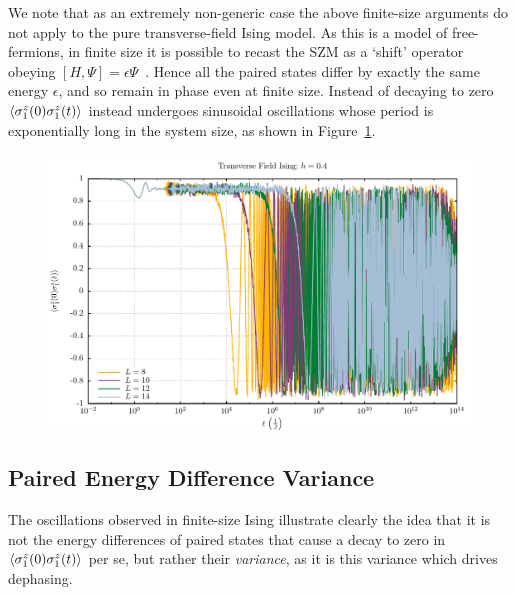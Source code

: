 \documentclass [a4paper, 11pt]{article}
\begin{document}
We note that as an extremely non-generic case the above finite-size arguments do not apply to the pure transverse-field Ising model. As this is a model of free-fermions, in finite size it is possible to recast the SZM as a `shift' operator obeying $[H, \Psi] = \epsilon \Psi$~\cite{freefermions}. Hence all the paired states differ by exactly the same energy $\epsilon$, and so remain in phase even at finite size. Instead of decaying to zero $\Braket{\sigma^z_1(0)\sigma^z_1(t)}$ instead undergoes sinusoidal oscillations whose period is exponentially long in the system size, as shown in Figure~\ref{fig:isingdecay}.

\begin{figure} [htbp]
\centering
 \includegraphics[width=\linewidth]{Ising_log_decay.pdf}
\caption{}
\label{fig:isingdecay}
\end{figure}

\subsection{Paired Energy Difference Variance}
\label{sec:pedv}
The oscillations observed in finite-size Ising illustrate clearly the idea that it is not the energy differences of paired states that cause a decay to zero in $\Braket{\sigma^z_1(0)\sigma^z_1(t)}$ per se, but rather their \emph{variance}, as it is this variance which drives dephasing. 
\end{document}
